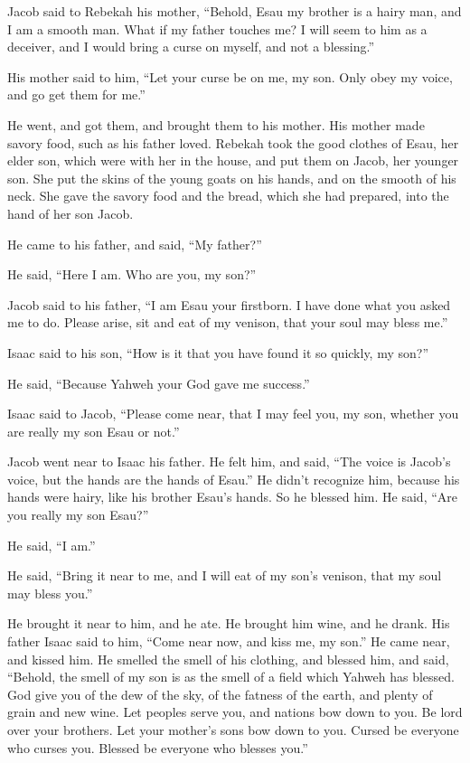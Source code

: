  Jacob said to Rebekah his mother, ``Behold, Esau my
brother is a hairy man, and I am a smooth man.  What if my
father touches me? I will seem to him as a deceiver, and I would bring a
curse on myself, and not a blessing.''

 His mother said to him, ``Let your curse be on me, my son.
Only obey my voice, and go get them for me.''

 He went, and got them, and brought them to his mother. His
mother made savory food, such as his father loved.  Rebekah
took the good clothes of Esau, her elder son, which were with her in the
house, and put them on Jacob, her younger son.  She put the
skins of the young goats on his hands, and on the smooth of his neck.
 She gave the savory food and the bread, which she had
prepared, into the hand of her son Jacob.

 He came to his father, and said, ``My father?''

He said, ``Here I am. Who are you, my son?''

 Jacob said to his father, ``I am Esau your firstborn. I
have done what you asked me to do. Please arise, sit and eat of my
venison, that your soul may bless me.''

 Isaac said to his son, ``How is it that you have found it
so quickly, my son?''

He said, ``Because Yahweh your God gave me success.''

 Isaac said to Jacob, ``Please come near, that I may feel
you, my son, whether you are really my son Esau or not.''

 Jacob went near to Isaac his father. He felt him, and
said, ``The voice is Jacob's voice, but the hands are the hands of
Esau.''  He didn't recognize him, because his hands were
hairy, like his brother Esau's hands. So he blessed him. 
He said, ``Are you really my son Esau?''

He said, ``I am.''

 He said, ``Bring it near to me, and I will eat of my son's
venison, that my soul may bless you.''

He brought it near to him, and he ate. He brought him wine, and he
drank.  His father Isaac said to him, ``Come near now, and
kiss me, my son.''  He came near, and kissed him. He
smelled the smell of his clothing, and blessed him, and said, ``Behold,
the smell of my son is as the smell of a field which Yahweh has blessed.
 God give you of the dew of the sky, of the fatness of the
earth, and plenty of grain and new wine.  Let peoples serve
you, and nations bow down to you. Be lord over your brothers. Let your
mother's sons bow down to you. Cursed be everyone who curses you.
Blessed be everyone who blesses you.''

